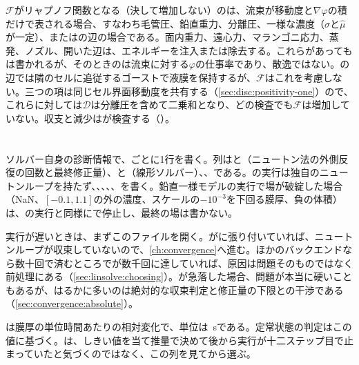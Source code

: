 \begin{warn}
  $\mathcal F$がリャプノフ関数となる（決して増加しない）のは、流束が移動度と$\nabla\varphi$の積だけで表される場合、すなわち毛管圧、鉛直重力、分離圧、一様な濃度（$\hat\sigma$と$\hat\mu$が一定）、またはの辺の場合である。面内重力、遠心力、マランゴニ応力、蒸発、ノズル、開いた辺は、エネルギーを注入または除去する。これらがあってもは書かれるが、そのときのは流束に対する$\varphi$の仕事率であり、散逸ではない。の辺では隣のセルに追従するゴーストで液膜を保持するが、$\mathcal F$はこれを考慮しない。三つの項は同じセル界面移動度を共有する（\cref{sec:disc:positivity-one}）ので、これらに対しては$\mathcal D$は分離圧を含めて二乗和となり、どの検査でも$\mathcal F$は増加していない。収支と減少はが検査する（）。
\end{warn}

\section{}
\label{sec:output:calcinfo}

ソルバー自身の診断情報で、ごとに1行を書く。列はと（ニュートン法の外側反復の回数と最終修正量）、と（線形ソルバー）、、である。の実行は独自のニュートンループを持たず、、、、、を書く。鉛直一様モデルの実行で場が破綻した場合（NaN、$[-0.1, 1.1]$の外の濃度、スケールの$-10^{-3}$を下回る膜厚、負の体積）は、の実行と同様にで停止し、最終の場は書かない。

実行が遅いときは、まずこのファイルを開く。がに張り付いていれば、ニュートンループが収束していないので、\cref{ch:convergence}へ進む。ほかのバックエンドなら数十回で済むところでが数千回に達していれば、原因は問題そのものではなく前処理にある（\cref{sec:linsolve:choosing}）。が急落した場合、問題が本当に硬いこともあるが、はるかに多いのは絶対的な収束判定と修正量の下限との干渉である（\cref{sec:convergence:absolute}）。

は膜厚の単位時間あたりの相対変化で、単位は\si{\per\second}である。定常状態の判定はこの値に基づく。は、しきい値を当て推量で決めて後から実行が十二ステップ目で止まっていたと気づくのではなく、この列を見てから選ぶ。

